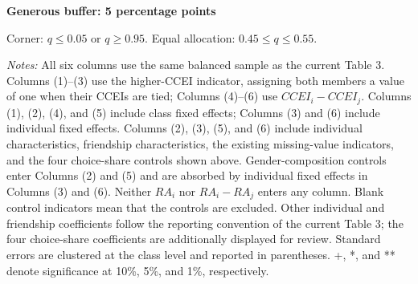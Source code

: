 \documentclass[11pt]{article}
\begin{document}
\clearpage\begin{center}{\large\bfseries Generous buffer: 5 percentage points}\end{center}
Corner: $q\leq0.05$ or $q\geq0.95$. Equal allocation: $0.45\leq q\leq0.55$.
\begin{center}
\end{center}
{\footnotesize\textit{Notes:} All six columns use the same balanced sample as the current Table 3. Columns (1)--(3) use the higher-CCEI indicator, assigning both members a value of one when their CCEIs are tied; Columns (4)--(6) use $CCEI_i-CCEI_j$. Columns (1), (2), (4), and (5) include class fixed effects; Columns (3) and (6) include individual fixed effects. Columns (2), (3), (5), and (6) include individual characteristics, friendship characteristics, the existing missing-value indicators, and the four choice-share controls shown above. Gender-composition controls enter Columns (2) and (5) and are absorbed by individual fixed effects in Columns (3) and (6). Neither $RA_i$ nor $RA_i-RA_j$ enters any column. Blank control indicators mean that the controls are excluded. Other individual and friendship coefficients follow the reporting convention of the current Table 3; the four choice-share coefficients are additionally displayed for review. Standard errors are clustered at the class level and reported in parentheses. +, *, and ** denote significance at 10\%, 5\%, and 1\%, respectively.}
\end{document}
